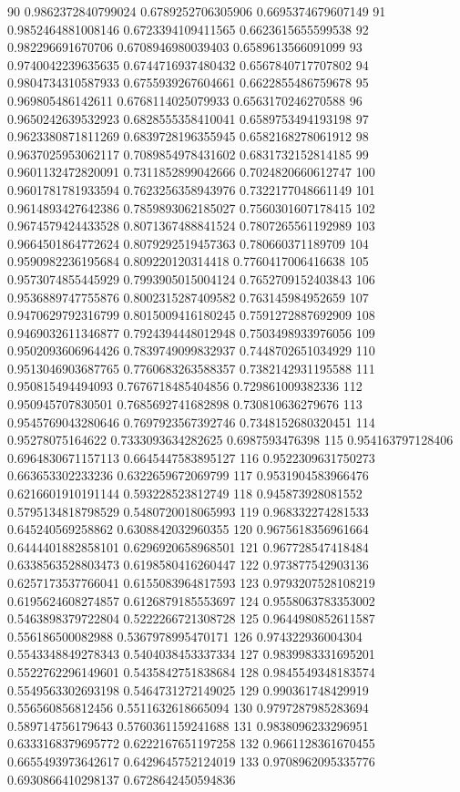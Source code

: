 90	0.9862372840799024	0.6789252706305906	0.6695374679607149
91	0.9852464881008146	0.6723394109411565	0.6623615655599538
92	0.982296691670706	0.6708946980039403	0.6589613566091099
93	0.9740042239635635	0.6744716937480432	0.6567840717707802
94	0.9804734310587933	0.6755939267604661	0.6622855486759678
95	0.969805486142611	0.6768114025079933	0.6563170246270588
96	0.9650242639532923	0.6828555358410041	0.6589753494193198
97	0.9623380871811269	0.6839728196355945	0.6582168278061912
98	0.9637025953062117	0.7089854978431602	0.6831732152814185
99	0.9601132472820091	0.7311852899042666	0.7024820660612747
100	0.9601781781933594	0.7623256358943976	0.7322177048661149
101	0.9614893427642386	0.7859893062185027	0.7560301607178415
102	0.9674579424433528	0.8071367488841524	0.7807265561192989
103	0.9664501864772624	0.8079292519457363	0.780660371189709
104	0.9590982236195684	0.809220120314418	0.7760417006416638
105	0.9573074855445929	0.7993905015004124	0.7652709152403843
106	0.9536889747755876	0.8002315287409582	0.763145984952659
107	0.9470629792316799	0.8015009416180245	0.7591272887692909
108	0.9469032611346877	0.7924394448012948	0.7503498933976056
109	0.9502093606964426	0.7839749099832937	0.7448702651034929
110	0.9513046903687765	0.7760683263588357	0.7382142931195588
111	0.950815494494093	0.7676718485404856	0.729861009382336
112	0.950945707830501	0.7685692741682898	0.730810636279676
113	0.9545769043280646	0.7697923567392746	0.7348152680320451
114	0.95278075164622	0.7333093634282625	0.6987593476398
115	0.954163797128406	0.6964830671157113	0.6645447583895127
116	0.9522309631750273	0.663653302233236	0.6322659672069799
117	0.9531904583966476	0.6216601910191144	0.593228523812749
118	0.945873928081552	0.5795134818798529	0.5480720018065993
119	0.968332274281533	0.645240569258862	0.6308842032960355
120	0.9675618356961664	0.6444401882858101	0.6296920658968501
121	0.967728547418484	0.6338563528803473	0.6198580416260447
122	0.973877542903136	0.6257173537766041	0.6155083964817593
123	0.9793207528108219	0.6195624608274857	0.6126879185553697
124	0.9558063783353002	0.5463898379722804	0.5222266721308728
125	0.9644980852611587	0.556186500082988	0.5367978995470171
126	0.974322936004304	0.5543348849278343	0.5404038453337334
127	0.9839983331695201	0.5522762296149601	0.5435842751838684
128	0.9845549348183574	0.5549563302693198	0.5464731272149025
129	0.990361748429919	0.556560856812456	0.5511632618665094
130	0.9797287985283694	0.589714756179643	0.5760361159241688
131	0.9838096233296951	0.6333168379695772	0.6222167651197258
132	0.9661128361670455	0.6655493973642617	0.6429645752124019
133	0.9708962095335776	0.6930866410298137	0.6728642450594836
